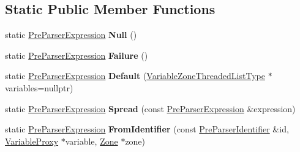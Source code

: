 \subsection*{Static Public Member Functions}
\begin{DoxyCompactItemize}
\item 
\mbox{\label{classv8_1_1internal_1_1PreParserExpression_a695b71d2faf7e0120e72f73eb1437fa7}} 
static \mbox{\hyperlink{classv8_1_1internal_1_1PreParserExpression}{Pre\+Parser\+Expression}} {\bfseries Null} ()
\item 
\mbox{\label{classv8_1_1internal_1_1PreParserExpression_a50baf4f9cf92bc47fbd571b1ef5b443b}} 
static \mbox{\hyperlink{classv8_1_1internal_1_1PreParserExpression}{Pre\+Parser\+Expression}} {\bfseries Failure} ()
\item 
\mbox{\label{classv8_1_1internal_1_1PreParserExpression_ab86e8697112e5f6161192844bad6ca65}} 
static \mbox{\hyperlink{classv8_1_1internal_1_1PreParserExpression}{Pre\+Parser\+Expression}} {\bfseries Default} (\mbox{\hyperlink{classv8_1_1base_1_1ThreadedListBase}{Variable\+Zone\+Threaded\+List\+Type}} $\ast$variables=nullptr)
\item 
\mbox{\label{classv8_1_1internal_1_1PreParserExpression_aa3897846959e3779b8cf1cff6131e7c3}} 
static \mbox{\hyperlink{classv8_1_1internal_1_1PreParserExpression}{Pre\+Parser\+Expression}} {\bfseries Spread} (const \mbox{\hyperlink{classv8_1_1internal_1_1PreParserExpression}{Pre\+Parser\+Expression}} \&expression)
\item 
\mbox{\label{classv8_1_1internal_1_1PreParserExpression_ab90320cba024a556afe59e4280acf2a6}} 
static \mbox{\hyperlink{classv8_1_1internal_1_1PreParserExpression}{Pre\+Parser\+Expression}} {\bfseries From\+Identifier} (const \mbox{\hyperlink{classv8_1_1internal_1_1PreParserIdentifier}{Pre\+Parser\+Identifier}} \&id, \mbox{\hyperlink{classv8_1_1internal_1_1VariableProxy}{Variable\+Proxy}} $\ast$variable, \mbox{\hyperlink{classv8_1_1internal_1_1Zone}{Zone}} $\ast$zone)
\item 
\mbox{\label{classv8_1_1internal_1_1PreParserExpression_aeb668ea9078bbdff2d708c663b296fb1}} 

\end{DoxyCompactItemize}
